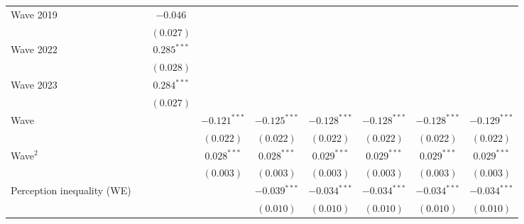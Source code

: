 \documentclass[
  12pt,
]{article}
\begin{document}
\begin{table}
\begin{center}
{\begin{tabular}{l c c c c c c c c}
\quad Wave 2019                                       &               & $-0.046$       &                &                &                &                &                &                \\
                                                      &               & $(0.027)$      &                &                &                &                &                &                \\
\quad Wave 2022                                       &               & $0.285^{***}$  &                &                &                &                &                &                \\
                                                      &               & $(0.028)$      &                &                &                &                &                &                \\
\quad Wave 2023                                       &               & $0.284^{***}$  &                &                &                &                &                &                \\
                                                      &               & $(0.027)$      &                &                &                &                &                &                \\
Wave                                                  &               &                & $-0.121^{***}$ & $-0.125^{***}$ & $-0.128^{***}$ & $-0.128^{***}$ & $-0.128^{***}$ & $-0.129^{***}$ \\
                                                      &               &                & $(0.022)$      & $(0.022)$      & $(0.022)$      & $(0.022)$      & $(0.022)$      & $(0.022)$      \\
Wave$^2$                                              &               &                & $0.028^{***}$  & $0.028^{***}$  & $0.029^{***}$  & $0.029^{***}$  & $0.029^{***}$  & $0.029^{***}$  \\
                                                      &               &                & $(0.003)$      & $(0.003)$      & $(0.003)$      & $(0.003)$      & $(0.003)$      & $(0.003)$      \\
Perception inequality (WE)                            &               &                &                & $-0.039^{***}$ & $-0.034^{***}$ & $-0.034^{***}$ & $-0.034^{***}$ & $-0.034^{***}$ \\
                                                      &               &                &                & $(0.010)$      & $(0.010)$      & $(0.010)$      & $(0.010)$      & $(0.010)$      \\

\end{tabular}}
\end{center}
\end{table}
\end{document}
